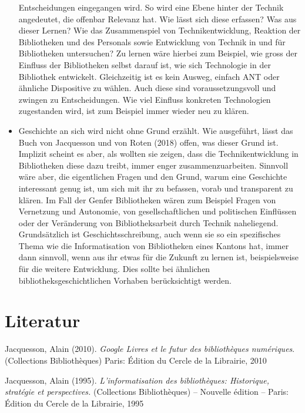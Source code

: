 \documentclass[a4paper,
fontsize=11pt,
oneside,
numbers=noperiodatend,
parskip=half-,
bibliography=totoc,
final
]{scrartcl}
\begin{document}
\begin{itemize}
  Entscheidungen eingegangen wird. So wird eine Ebene hinter der Technik
  angedeutet, die offenbar Relevanz hat. Wie lässt sich diese erfassen?
  Was aus dieser Lernen? Wie das Zusammenspiel von Technikentwicklung,
  Reaktion der Bibliotheken und des Personals sowie Entwicklung von
  Technik in und für Bibliotheken untersuchen? Zu lernen wäre hierbei
  zum Beispiel, wie gross der Einfluss der Bibliotheken selbst darauf
  ist, wie sich Technologie in der Bibliothek entwickelt. Gleichzeitig
  ist es kein Ausweg, einfach ANT oder ähnliche Dispositive zu wählen.
  Auch diese sind voraussetzungsvoll und zwingen zu Entscheidungen. Wie
  viel Einfluss konkreten Technologien zugestanden wird, ist zum
  Beispiel immer wieder neu zu klären.
\item
  Geschichte an sich wird nicht ohne Grund erzählt. Wie ausgeführt,
  lässt das Buch von Jacquesson und von Roten (2018) offen, was dieser
  Grund ist. Implizit scheint es aber, als wollten sie zeigen, dass die
  Technikentwicklung in Bibliotheken diese dazu treibt, immer enger
  zusammenzuarbeiten. Sinnvoll wäre aber, die eigentlichen Fragen und
  den Grund, warum eine Geschichte interessant genug ist, um sich mit
  ihr zu befassen, vorab und transparent zu klären. Im Fall der Genfer
  Bibliotheken wären zum Beispiel Fragen von Vernetzung und Autonomie,
  von gesellschaftlichen und politischen Einflüssen oder der Veränderung
  von Bibliotheksarbeit durch Technik naheliegend. Grundsätzlich ist
  Geschichtsschreibung, auch wenn sie so ein spezifisches Thema wie die
  Informatisation von Bibliotheken eines Kantons hat, immer dann
  sinnvoll, wenn aus ihr etwas für die Zukunft zu lernen ist,
  beispielsweise für die weitere Entwicklung. Dies sollte bei ähnlichen
  bibliotheksgeschichtlichen Vorhaben berücksichtigt werden.
\end{itemize}

\hypertarget{literatur}{%
\section{Literatur}\label{literatur}}

Jacquesson, Alain (2010). \emph{Google Livres et le futur des
bibliothèques numériques}. (Collections Bibliothèques) Paris: Édition du
Cercle de la Librairie, 2010

Jacquesson, Alain (1995). \emph{L'informatisation des bibliothèques:
Historique, stratégie et perspectives.} (Collections Bibliothèques) --
Nouvelle édition -- Paris: Édition du Cercle de la Librairie, 1995
\end{document}
